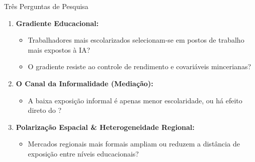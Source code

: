 \documentclass[aspectratio=169, 10pt]{beamer}
\begin{document}
\begin{frame}{Três Perguntas de Pesquisa}
    \begin{enumerate}
        \item \textbf{Gradiente Educacional:}
        \begin{itemize}
            \item Trabalhadores mais escolarizados selecionam-se
            em postos de trabalho mais expostos à IA?
            \item O gradiente resiste ao controle de rendimento e
            covariáveis mincerianas?
        \end{itemize}
        \vspace{0.4em}
        \item \textbf{O Canal da Informalidade (Mediação):}
        \begin{itemize}
            \item A baixa exposição informal é apenas menor escolaridade,
            ou há efeito direto do ?
        \end{itemize}
        \vspace{0.4em}
        \item \textbf{Polarização Espacial \& Heterogeneidade Regional:}
        \begin{itemize}
            \item Mercados regionais mais formais ampliam ou reduzem a
            distância de exposição entre níveis educacionais?
        \end{itemize}
    \end{enumerate}
\end{frame}

\end{document}

